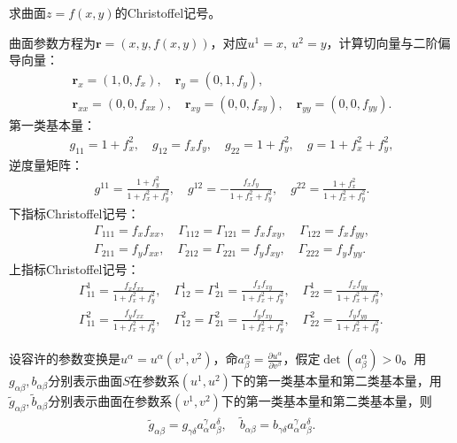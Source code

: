 \documentclass[../../main.tex]{subfiles}%
\begin{document}
\begin{example}
求曲面$z=f(x,y)$的Christoffel记号。
\end{example}
\begin{solution}

曲面参数方程为$\boldsymbol{r}=(x,y,f(x,y))$，对应$u^1=x,\ u^2=y$，计算切向量与二阶偏导向量：
\begin{align*}
\boldsymbol{r}_x=(1,0,f_x),\quad \boldsymbol{r}_y=(0,1,f_y),\\
\boldsymbol{r}_{xx}=(0,0,f_{xx}),\quad \boldsymbol{r}_{xy}=(0,0,f_{xy}),\quad \boldsymbol{r}_{yy}=(0,0,f_{yy}).
\end{align*}
第一类基本量：
\begin{align*}
g_{11}=1+f_x^2,\quad g_{12}=f_xf_y,\quad g_{22}=1+f_y^2,\quad g=1+f_x^2+f_y^2,
\end{align*}
逆度量矩阵：
\begin{align*}
g^{11}=\frac{1+f_y^2}{1+f_x^2+f_y^2},\quad g^{12}=-\frac{f_xf_y}{1+f_x^2+f_y^2},\quad g^{22}=\frac{1+f_x^2}{1+f_x^2+f_y^2}.
\end{align*}
下指标Christoffel记号：
\begin{align*}
\Gamma_{111}=f_xf_{xx},\quad \Gamma_{112}=\Gamma_{121}=f_xf_{xy},\quad \Gamma_{122}=f_xf_{yy},\\
\Gamma_{211}=f_yf_{xx},\quad \Gamma_{212}=\Gamma_{221}=f_yf_{xy},\quad \Gamma_{222}=f_yf_{yy}.
\end{align*}
上指标Christoffel记号：
\begin{align*}
\Gamma^1_{11}=\frac{f_xf_{xx}}{1+f_x^2+f_y^2},\quad \Gamma^1_{12}=\Gamma^1_{21}=\frac{f_xf_{xy}}{1+f_x^2+f_y^2},\quad \Gamma^1_{22}=\frac{f_xf_{yy}}{1+f_x^2+f_y^2},\\
\Gamma^2_{11}=\frac{f_yf_{xx}}{1+f_x^2+f_y^2},\quad \Gamma^2_{12}=\Gamma^2_{21}=\frac{f_yf_{xy}}{1+f_x^2+f_y^2},\quad \Gamma^2_{22}=\frac{f_yf_{yy}}{1+f_x^2+f_y^2}.
\end{align*}

\end{solution}

\begin{example}
设容许的参数变换是$u^\alpha = u^\alpha(v^1,v^2)$，命$a^\alpha_\beta = \frac{\partial u^\alpha}{\partial v^\beta}$，假定$\det(a^\alpha_\beta) > 0$。用$g_{\alpha\beta},b_{\alpha\beta}$分别表示曲面$S$在参数系$(u^1,u^2)$下的第一类基本量和第二类基本量，用$\tilde{g}_{\alpha\beta},\tilde{b}_{\alpha\beta}$分别表示曲面在参数系$(v^1,v^2)$下的第一类基本量和第二类基本量，则
\begin{align*}
\tilde{g}_{\alpha\beta} = g_{\gamma\delta}a^\gamma_\alpha a^\delta_\beta,\quad \tilde{b}_{\alpha\beta} = b_{\gamma\delta}a^\gamma_\alpha a^\delta_\beta.
\end{align*}

\end{example}
\end{document}
